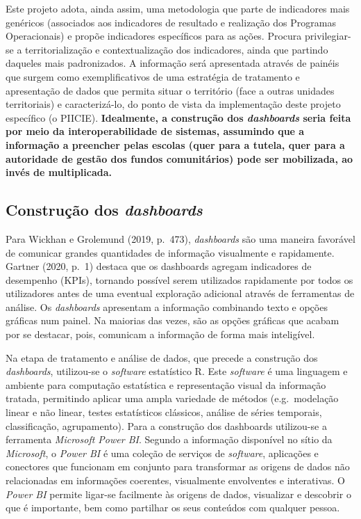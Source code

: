 \documentclass[
]{book}
\begin{document}
Este projeto adota, ainda assim, uma metodologia que parte de indicadores mais genéricos (associados aos indicadores de resultado e realização dos Programas Operacionais) e propõe indicadores específicos para as ações. Procura privilegiar-se a territorialização e contextualização dos indicadores, ainda que partindo daqueles mais padronizados. A informação será apresentada através de painéis que surgem como exemplificativos de uma estratégia de tratamento e apresentação de dados que permita situar o território (face a outras unidades territoriais) e caracterizá-lo, do ponto de vista da implementação deste projeto específico (o PIICIE). \textbf{Idealmente, a construção dos \emph{dashboards} seria feita por meio da interoperabilidade de sistemas, assumindo que a informação a preencher pelas escolas (quer para a tutela, quer para a autoridade de gestão dos fundos comunitários) pode ser mobilizada, ao invés de multiplicada.}

\hypertarget{construuxe7uxe3o-dos-dashboards}{%
\subsection{\texorpdfstring{Construção dos \emph{dashboards}}{Construção dos dashboards}}\label{construuxe7uxe3o-dos-dashboards}}

Para Wickhan e Grolemund (2019, p.~473), \emph{dashboards} são uma maneira favorável de comunicar grandes quantidades de informação visualmente e rapidamente. Gartner (2020, p.~1) destaca que os dashboards agregam indicadores de desempenho (KPIs), tornando possível serem utilizados rapidamente por todos os utilizadores antes de uma eventual exploração adicional através de ferramentas de análise. Os \emph{dashboards} apresentam a informação combinando texto e opções gráficas num painel. Na maiorias das vezes, são as opções gráficas que acabam por se destacar, pois, comunicam a informação de forma mais inteligível.

Na etapa de tratamento e análise de dados, que precede a construção dos \emph{dashboards}, utilizou-se o \emph{software} estatístico R. Este \emph{software} é uma linguagem e ambiente para computação estatística e representação visual da informação tratada, permitindo aplicar uma ampla variedade de métodos (e.g.~modelação linear e não linear, testes estatísticos clássicos, análise de séries temporais, classificação, agrupamento). Para a construção dos dashboards utilizou-se a ferramenta \emph{Microsoft Power BI}. Segundo a informação disponível no sítio da \emph{Microsoft}, o \emph{Power BI} é uma coleção de serviços de \emph{software}, aplicações e conectores que funcionam em conjunto para transformar as origens de dados não relacionadas em informações coerentes, visualmente envolventes e interativas. O \emph{Power BI} permite ligar-se facilmente às origens de dados, visualizar e descobrir o que é importante, bem como partilhar os seus conteúdos com qualquer pessoa.
\end{document}

